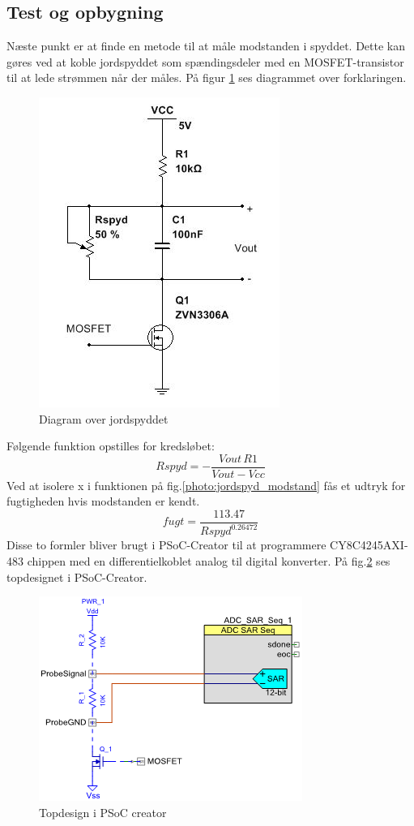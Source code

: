 \subsection{Test og opbygning}
Næste punkt er at finde en metode til at måle modstanden i spyddet. Dette kan gøres ved at koble jordspyddet som spændingsdeler med en MOSFET-transistor til at lede strømmen når der måles. På figur \ref{photo:jordspyd_diagram} ses diagrammet over forklaringen. 
 
\begin{figure}[H]
	\centering 
	\includegraphics[scale=0.8]{HardwareArkitektur/Sensore/Jordfugt_billeder/jordspyd.JPG}
	\caption{Diagram over jordspyddet}
	\label{photo:jordspyd_diagram}
\end{figure} 

Følgende funktion opstilles for kredsløbet:
$$Rspyd=-{\frac {{Vout}\,{R1}}{{Vout}-{Vcc}}}$$
Ved at isolere x i funktionen på fig.\ref{photo:jordspyd_modstand} fås et udtryk for fugtigheden hvis modstanden er kendt. 
$$fugt=\frac{113.47}{Rspyd^{0.26472}}$$
Disse to formler bliver brugt i PSoC-Creator til at programmere CY8C4245AXI-483 chippen med en differentielkoblet analog til digital konverter. På fig.\ref{photo:ADC} ses topdesignet i PSoC-Creator.    

\begin{figure}[H]
	\centering 
	\includegraphics[scale=0.8]{HardwareArkitektur/Sensore/Jordfugt_billeder/SAR_converter.png}
	\caption{Topdesign i PSoC creator}
	\label{photo:ADC}
\end{figure} 

